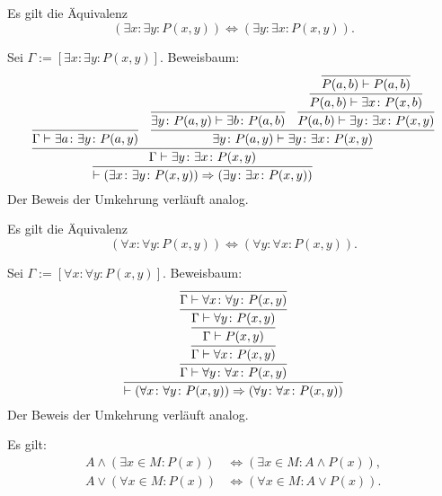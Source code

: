 \begin{Satz}\label{exists-cl}
Es gilt die Äquivalenz
\[(\exists x\colon\exists y\colon P(x,y)) \iff (\exists y\colon\exists x\colon P(x,y)).\]
\end{Satz}
\begin{Beweis}[Beweis]
Sei $\Gamma:=[\exists x\colon\exists y\colon P(x,y)]$.
Beweisbaum:
\[
\infer{\vdash(\exists x\colon\exists y\colon P(x,y))
  \Rightarrow (\exists y\colon\exists x\colon P(x,y))
}{
  \infer{\Gamma\vdash\exists y\colon\exists x\colon P(x,y)}{
    \infer{\Gamma\vdash\exists a\colon\exists y\colon P(a,y)}{}
  & \infer{\exists y\colon P(a,y)\vdash\exists y\colon\exists x\colon P(x,y)}{
      \infer{\exists y\colon P(a,y)\vdash\exists b\colon P(a,b)}{}
    & \infer{P(a,b)\vdash\exists y\colon\exists x\colon P(x,y)}{
        \infer{P(a,b)\vdash\exists x\colon P(x,b)}{
          \infer{P(a,b)\vdash P(a,b)}{}}}}}}
\]
Der Beweis der Umkehrung verläuft analog.\,\qedsymbol
\end{Beweis}

\begin{Satz}\label{all-cl}
Es gilt die Äquivalenz
\[(\forall x\colon\forall y\colon P(x,y))
\iff (\forall y\colon\forall x\colon P(x,y)).\]
\end{Satz}
\begin{Beweis}[Beweis]
Sei $\Gamma:=[\forall x\colon\forall y\colon P(x,y)]$.
Beweisbaum:
\[
\infer{\vdash (\forall x\colon\forall y\colon P(x,y))
  \Rightarrow (\forall y\colon\forall x\colon P(x,y))
}{
  \infer{\Gamma\vdash\forall y\colon\forall x\colon P(x,y)}{
    \infer{\Gamma\vdash\forall x\colon P(x,y)}{
      \infer{\Gamma\vdash P(x,y)}{
        \infer{\Gamma\vdash\forall y\colon P(x,y)}{
          \infer{\Gamma\vdash\forall x\colon\forall y\colon P(x,y)}{}}}}}}
\]
Der Beweis der Umkehrung verläuft analog.\,\qedsymbol
\end{Beweis}

\begin{Satz}%
\label{bounded-general-dl}
Es gilt:
\begin{align*}
A\land (\exists x{\in}M\colon P(x)) &\iff (\exists x{\in}M\colon A\land P(x)),\\
A\lor (\forall x{\in}M\colon P(x)) &\iff (\forall x{\in}M\colon A\lor P(x)).
\end{align*}
\end{Satz}

